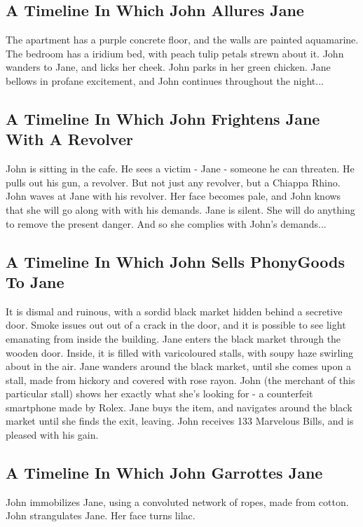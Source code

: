 \documentclass{article}
\begin{document}
\subsection{A Timeline In Which John Allures Jane}


The apartment has a purple concrete floor, and the walls are painted aquamarine.
The bedroom has a iridium bed, with peach tulip petals strewn about it.
John wanders to Jane, and licks her cheek.
John parks in her green chicken.
Jane bellows in profane excitement, and John continues throughout the night...
\subsection{A Timeline In Which John Frightens Jane With A Revolver}


John is sitting in the cafe.
He sees a victim {-} Jane {-} someone he can threaten. He pulls out his gun, a revolver.
But not just any revolver, but a Chiappa Rhino.
John waves at Jane with his revolver. Her face becomes pale, and John knows that she will go along with with his demands.
Jane is silent. She will do anything to remove the present danger. And so she complies with John's demands...
\subsection{A Timeline In Which John Sells PhonyGoods To Jane}


It is dismal and ruinous, with a sordid black market hidden behind a secretive door.
Smoke issues out out of a crack in the door, and it is possible to see light emanating from inside the building.
Jane enters the black market through the wooden door.
Inside, it is filled with varicoloured stalls, with soupy haze swirling about in the air.
Jane wanders around the black market, until she comes upon a stall, made from hickory and covered with rose rayon.
John (the merchant of this particular stall) shows her exactly what she's looking for {-} a counterfeit smartphone made by Rolex.
Jane buys the item, and navigates around the black market until she finds the exit, leaving.
John receives 133 Marvelous Bills, and is pleased with his gain.
\subsection{A Timeline In Which John Garrottes Jane}


John immobilizes Jane, using a convoluted network of ropes, made from cotton.
John strangulates Jane.
Her face turns lilac.
\end{document}
